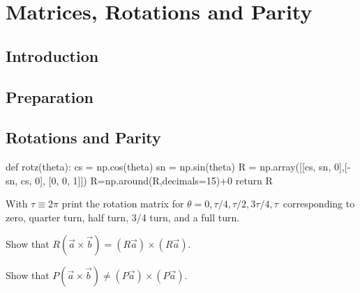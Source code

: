 \chapter{Matrices, Rotations and Parity}

\section{Introduction}

\section{Preparation}

\section{Rotations and Parity}
\begin{python}
def rotz(theta):
    cs = np.cos(theta)
    sn = np.sin(theta)
    R  = np.array([[cs, sn, 0],[-sn, cs, 0], [0, 0, 1]])
    R=np.around(R,decimals=15)+0
    return R
\end{python}

\begin{plot} With $\tau \equiv 2 \pi$ print the rotation matrix for $\theta = 0, \tau/4, \tau/2, 3 \tau/4, \tau$\
 corresponding to zero, quarter turn, half turn, 3/4 turn, and a full turn.\end{plot}



\begin{plot} Show that $R(\vec{a} \times \vec{b}) = (R\vec{a}) \times (R\vec{a})$.\end{plot}


\begin{plot} Show that $P(\vec{a} \times \vec{b}) \neq (P\vec{a}) \times (P\vec{a})$.\end{plot}

